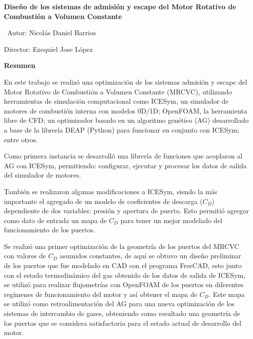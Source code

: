 \newpage
\thispagestyle{plain}

\begin{center}
\large{\textbf{{Diseño de los sistemas de admisión y escape del Motor Rotativo de Combustión a Volumen Constante}}}\\
\end{center}

\normalsize
\
 \hfill Autor: Nicolás Daniel Barrios

\hfill Director: Ezequiel Jose López


\textbf{Resumen}


En este trabajo se realizó una optimización de los sistemas  admisión y escape
del Motor Rotativo de Combustión a Volumen Constante (MRCVC), utilizando
herramientas de simulación computacional como ICESym, un simulador de motores
de combustión interna con modelos 0D/1D; OpenFOAM, la herramienta libre de CFD;
un optimizador basado en un algoritmo genético (AG) desarrollado a base de la
librería DEAP (Python) para funcionar en conjunto con ICESym; entre otros.

Como primera instancia se desarrolló una librería de funciones que acoplaron al
AG con ICESym, permitiendo: configurar, ejecutar y procesar los datos de salida
del simulador de motores.
%

También se realizaron algunas modificaciones a ICESym, siendo la más importante
el agregado de un modelo de coeficientes de descarga ($C_D$) dependiente de dos
variables: presión y apertura de puerto.
%
Esto permitió agregar como dato de entrada un mapa de $C_D$ para tener un mejor
modelado del funcionamiento de los puertos.


Se realizó una primer optimización de la geometría de los puertos del MRCVC con
valores de $C_D$ asumidos constantes, de aquí se obtuvo un diseño preliminar de
los puertos que fue modelado en CAD con el programa FreeCAD, esto junto con el
estado termodinámico del gas obtenido de los datos de salida de ICESym, se
utilizó para realizar flujometrías con OpenFOAM de los puertos en diferentes
regímenes de funcionamiento del motor y así obtener el mapa de $C_D$.
%
Este mapa se utilizó como retroalimentación del AG para una nueva optimización
de los sistemas de intercambio de gases, obteniendo como resultado una
geometría de los puertos que se considera satisfactoria para el estado actual
de desarrollo del motor.


